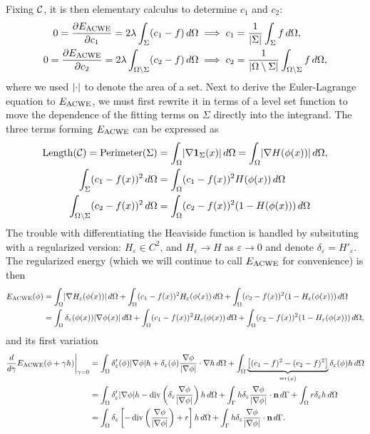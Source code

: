 Fixing $\mathcal{C}$, it is then elementary calculus to determine $c_1$ and $c_2$: 
\begin{align*}
0 = \frac{\partial E_\textrm{ACWE}}{\partial c_1}  = 2\lambda \int_{\Sigma} (c_1 - f ) \,d\Omega
&\implies 
c_1 = \frac{1}{\lvert\Sigma\rvert} \int_{\Sigma} f \,d\Omega,
\\
0 = \frac{\partial E_\textrm{ACWE}}{\partial c_2}  = 2\lambda \int_{\Omega\setminus \Sigma} (c_2 - f )\,d\Omega
&\implies 
c_2 = \frac{1}{\lvert\Omega\setminus\Sigma\rvert} \int_{\Omega\setminus \Sigma} f \,d\Omega,
\end{align*}
where we used $\lvert\cdot\rvert$ to denote the area of a set. Next to derive the Euler-Lagrange equation to $E_\textrm{ACWE}$, we must first rewrite it in terms of a level set function to move the dependence of the fitting terms on $\Sigma$ directly into the integrand. The three terms forming $E_\textrm{ACWE}$ can be expressed as 
\begin{align}
\textrm{Length}(\mathcal{C}) 
= \textrm{Perimeter}(\Sigma) 
&= \int_{\Omega} \lvert\nabla \mathbf{1}_\Sigma(x)\rvert \,d\Omega
= \int_{\Omega} \lvert \nabla H(\phi(x)) \rvert \,d\Omega,
\label{eacwe1}
\\
\int_{\Sigma} (c_1 - f(x) )^2 \, d\Omega 
&= \int_{\Omega} (c_1 - f(x))^2 H(\phi(x)) \, d\Omega
\\
\int_{\Omega\setminus\Sigma} (c_2 - f(x))^2 \,d\Omega 
&=
\int_{\Omega} (c_2 - f(x))^2 (1 - H(\phi(x))) \,d\Omega
\end{align}
The trouble with differentiating the Heaviside function is handled by subsituting with a regularized version: $H_\varepsilon \in C^2$, and $H_\varepsilon \rightarrow H$ as $\varepsilon\rightarrow 0$ and denote $\delta_\varepsilon = H'_\varepsilon$. The regularized energy (which we will continue to call $E_\textrm{ACWE}$ for convenience) is then 
\begin{align*}
E_\textrm{ACWE}(\phi) 
&= \int_{\Omega } \lvert\nabla H_\varepsilon(\phi(x))\rvert \,d\Omega 
+ \int_{\Omega} (c_1 - f(x))^2 H_\varepsilon(\phi(x)) \, d\Omega 
+ \int_{\Omega} (c_2 - f(x))^2 (1 - H_\varepsilon(\phi(x))) \,d\Omega
\\
&= \int_{\Omega } \delta_\varepsilon(\phi(x)) \lvert\nabla \phi(x)\rvert \,d\Omega 
+ \int_{\Omega} (c_1 - f(x))^2 H_\varepsilon(\phi(x)) \, d\Omega 
+ \int_{\Omega} (c_2 - f(x))^2 (1 - H_\varepsilon(\phi(x))) \,d\Omega,
\end{align*}
and its first variation
\begin{align*}
\frac{d}{d\gamma}E_\textrm{ACWE}(\phi + \gamma h) \bigg\rvert_{\gamma = 0}
&= \int_{\Omega} \delta'_\varepsilon(\phi) \lvert\nabla \phi\rvert h + \delta_\varepsilon(\phi) \frac{\nabla \phi}{\lvert\nabla \phi\rvert} \cdot \nabla h \,d\Omega
+ \int_{\Omega} \underbrace{\left[(c_1 - f)^2 - (c_2 - f)^2 \right]}_{=r(x)} \delta_\varepsilon(\phi) h \,d\Omega 
\\
&= \int_{\Omega } \delta'_\varepsilon \lvert\nabla \phi\rvert h
- \operatorname{div}\left(\delta_\varepsilon\frac{\nabla \phi}{\lvert\nabla \phi\rvert}  \right)  h
\,d\Omega 
+ \int_\Gamma h\delta_\varepsilon\frac{\nabla \phi}{\lvert\nabla \phi\rvert} \cdot \mathbf{n} \,d\Gamma 
+ \int_{\Omega} r \delta_\varepsilon h \,d\Omega
\\
&= \int_{\Omega} \delta_\varepsilon\left[ 
- \operatorname{div}\left(\frac{\nabla \phi}{\lvert\nabla \phi\rvert} \right) + r
\right] h\,d\Omega 
+ \int_\Gamma h\delta_\varepsilon\frac{\nabla \phi}{\lvert\nabla \phi\rvert} \cdot \mathbf{n} \,d\Gamma. 
\end{align*}
